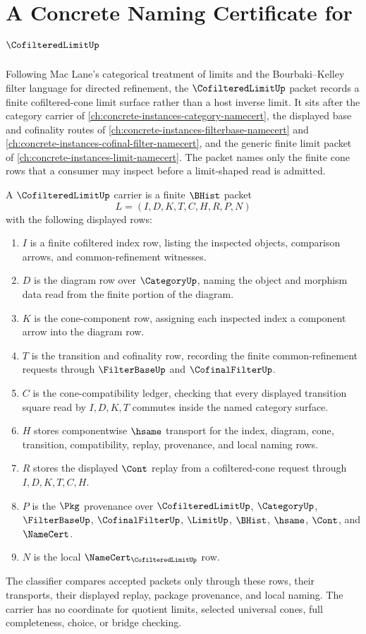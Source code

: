 \chapter{A Concrete Naming Certificate for $\CofilteredLimitUp$}
\label{ch:concrete-instances-cofiltered-limit-namecert}

Following Mac Lane's categorical treatment of limits and the Bourbaki--Kelley filter language for directed refinement, the $\CofilteredLimitUp$ packet records a finite cofiltered-cone limit surface rather than a host inverse limit. It sits after the category carrier of \autoref{ch:concrete-instances-category-namecert}, the displayed base and cofinality routes of \autoref{ch:concrete-instances-filterbase-namecert} and \autoref{ch:concrete-instances-cofinal-filter-namecert}, and the generic finite limit packet of \autoref{ch:concrete-instances-limit-namecert}. The packet names only the finite cone rows that a consumer may inspect before a limit-shaped read is admitted.

\begin{definition}
\label{def:cofiltered-limit-carrier}
A $\CofilteredLimitUp$ carrier is a finite $\BHist$ packet
$$
L=(I,D,K,T,C,H,R,P,N)
$$
with the following displayed rows:
\begin{enumerate}
\item $I$ is a finite cofiltered index row, listing the inspected objects, comparison arrows, and common-refinement witnesses.
\item $D$ is the diagram row over $\CategoryUp$, naming the object and morphism data read from the finite portion of the diagram.
\item $K$ is the cone-component row, assigning each inspected index a component arrow into the diagram row.
\item $T$ is the transition and cofinality row, recording the finite common-refinement requests through $\FilterBaseUp$ and $\CofinalFilterUp$.
\item $C$ is the cone-compatibility ledger, checking that every displayed transition square read by $I,D,K,T$ commutes inside the named category surface.
\item $H$ stores componentwise $\hsame$ transport for the index, diagram, cone, transition, compatibility, replay, provenance, and local naming rows.
\item $R$ stores the displayed $\Cont$ replay from a cofiltered-cone request through $I,D,K,T,C,H$.
\item $P$ is the $\Pkg$ provenance over $\CofilteredLimitUp$, $\CategoryUp$, $\FilterBaseUp$, $\CofinalFilterUp$, $\LimitUp$, $\BHist$, $\hsame$, $\Cont$, and $\NameCert$.
\item $N$ is the local $\NameCert_{\CofilteredLimitUp}$ row.
\end{enumerate}
The classifier compares accepted packets only through these rows, their transports, their displayed replay, package provenance, and local naming. The carrier has no coordinate for quotient limits, selected universal cones, full completeness, choice, or bridge checking.
\end{definition}

